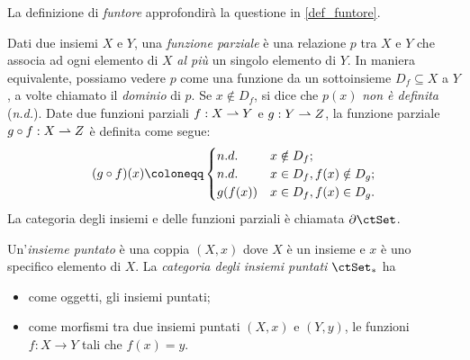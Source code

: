 La definizione di \emph{funtore} approfondirà la questione in \ref{def_funtore}.
\begin{example}\label{ex_cat_pfun}
	Dati due insiemi \(X\) e \(Y\), una \emph{funzione parziale} è una relazione \(p\) tra \(X\) e \(Y\) che associa ad ogni elemento di \(X\) \emph{al più} un singolo elemento di \(Y\). In maniera equivalente, possiamo vedere \(p\) come una funzione da un sottoinsieme \(D_f\subseteq X\) a \(Y\), a volte chiamato il \emph{dominio} di \(p\). Se \(x\notin D_f\), si dice che \(p(x)\) \emph{non è definita} (\emph{n.d.}).
	Date due funzioni parziali \(f:X\rightharpoonup Y\) e \(g:Y\rightharpoonup Z\), la funzione parziale \(g\circ f:X\rightharpoonup Z\) è definita come segue:
	\[
		(g\cmp f) (x) \coloneqq \begin{cases}
			n.d.    & x\notin D_f ;              \\
			n.d.    & x\in D_f, f(x)\notin D_g ; \\
			g(f(x)) & x\in D_f, f(x)\in D_g .
		\end{cases}
	\]
	La categoria degli insiemi e delle funzioni parziali è chiamata \(\pSet\).
\end{example}
\begin{example}\label{ex_cat_puntati}
	Un'\emph{insieme puntato} è una coppia \((X,x)\) dove \(X\) è un insieme e \(x\) è uno specifico elemento di \(X\).
	La \emph{categoria degli insiemi puntati} \(\ctSet_*\) ha
	\begin{itemize}
		\item come oggetti, gli insiemi puntati;
		\item come morfismi tra due insiemi puntati \((X,x)\) e \((Y,y)\), le funzioni \(f:X\to Y\) tali che \(f(x)=y\).
	\end{itemize}
\end{example}
